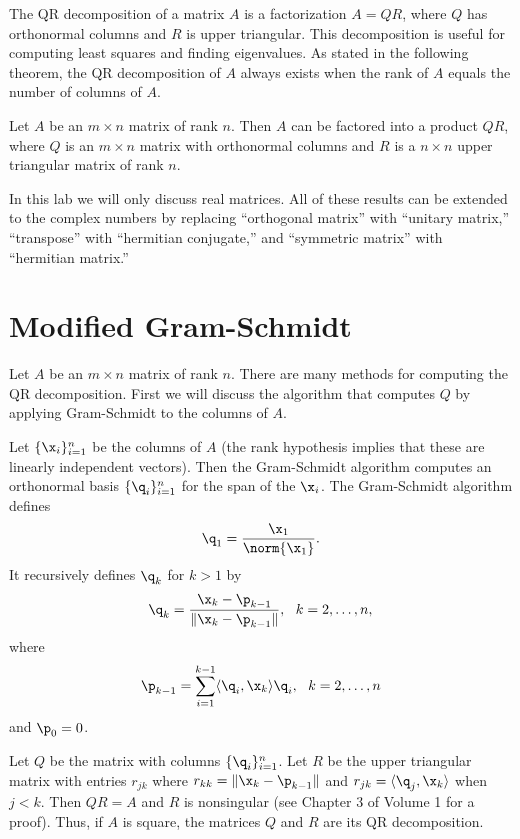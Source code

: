 \label{lab:QRdecomp}

The QR decomposition of a matrix $A$ is a factorization $A=QR$, where $Q$ has orthonormal columns and $R$ is upper triangular.
This decomposition is useful for computing least squares and finding eigenvalues.
As stated in the following theorem, the QR decomposition of $A$ always exists when the rank of $A$ equals the number of columns of $A$.
\begin{theorem}
Let $A$ be an $m\times n$ matrix of rank $n$.  Then $A$ can be
factored into a product $Q R$, where $Q$ is an $m\times n$ matrix
with orthonormal columns and $R$ is a $n \times n$ upper
triangular matrix of rank $n$.
\end{theorem}

In this lab we will only discuss real matrices.
All of these results can be extended to the complex numbers by replacing ``orthogonal matrix'' with ``unitary matrix,'' ``transpose'' with ``hermitian conjugate,'' and ``symmetric matrix'' with ``hermitian matrix.''

\section*{Modified Gram-Schmidt} %

Let $A$ be an $m \times n$ matrix of rank $n$.
There are many methods for computing the QR decomposition.
First we will discuss the algorithm that computes $Q$ by applying Gram-Schmidt to the columns of $A$.

Let $\{\x_i\}_{i=1}^n$ be the columns of $A$ (the rank hypothesis implies that these are linearly independent vectors).
Then the Gram-Schmidt algorithm computes an orthonormal basis $\{\q_i\}_{i=1}^n$ for the span of the $\x_i$.
The Gram-Schmidt algorithm defines  \[ \q_1 = \frac{\x_1}{\norm{\x_1}}.\]
It recursively defines $\q_k$ for $k>1$ by
\[
\q_{k} = \frac{\x_k - \p_{k-1}}{\|\x_k - \p_{k-1}\|}, \,\,\,\, k=2,\ldots,n,
\]
where
\[
\p_{k-1} = \sum_{i=1}^{k-1} \langle \q_i, \x_k\rangle \q_i, \,\,\,\, k=2, \ldots, n
\]
and $\p_0 = 0$.


Let $Q$ be the matrix with columns $\{\q_i\}_{i=1}^n$.
Let $R$ be the upper triangular matrix with entries $r_{jk}$ where $r_{kk} = \|\x_k-\p_{k-1}\|$ and $r_{j k} = \langle \q_j, \x_k\rangle$ when $j < k$.
Then $QR=A$ and $R$ is nonsingular (see Chapter 3 of Volume 1 for a proof).
Thus, if $A$ is square, the matrices $Q$ and $R$ are its QR decomposition.


